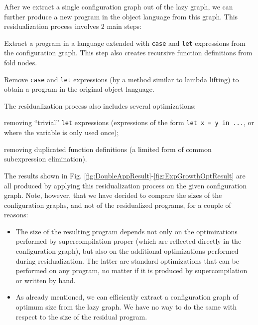 \documentclass[submission,copyright,creativecommons]{eptcs}
\begin{document}
After we extract a single configuration graph out of the lazy graph, we can further
produce a new program in the object language from this graph.
This residualization process involves 2 main steps:
  \begin{enumerate*}[label=\itshape\arabic*\upshape)]
    \item Extract a program in a language extended with \verb|case| and \verb|let| expressions from the configuration graph.
      This step also creates recursive function definitions from fold nodes.
    \item Remove \verb|case| and \verb|let| expressions (by a method similar to lambda lifting) to
      obtain a program in the original object language.
  \end{enumerate*}
The residualization process also includes several optimizations:
  \begin{enumerate*}[label=\itshape\alph*\upshape)]
    \item removing ``trivial'' \verb|let| expressions (expressions of the form \verb|let x = y in ...|, or where the variable is
      only used once);
    \item removing duplicated function definitions (a limited form of common subexpression elimination).
  \end{enumerate*}
The results shown in Fig. \ref{fig:DoubleAppResult}-\ref{fig:ExpGrowthOptResult} are all produced by applying
this residualization process on the given configuration graph.
Note, however, that we have decided to compare the sizes of the configuration graphs, and not of the residualized
programs, for a couple of reasons:
\begin{itemize}
  \item The size of the resulting program depends not only on the optimizations performed by supercompilation proper
    (which are reflected directly in the configuration graph), but also on the additional optimizations performed
    during residualization.
    The latter are standard optimizations that can be performed on any program, no matter if it is produced
    by supercompilation or written by hand.
  \item As already mentioned, we can efficiently extract a configuration graph of optimum size from the lazy graph.
    We have no way to do the same with respect to the size of the residual program.
\end{itemize}
\end{document}
